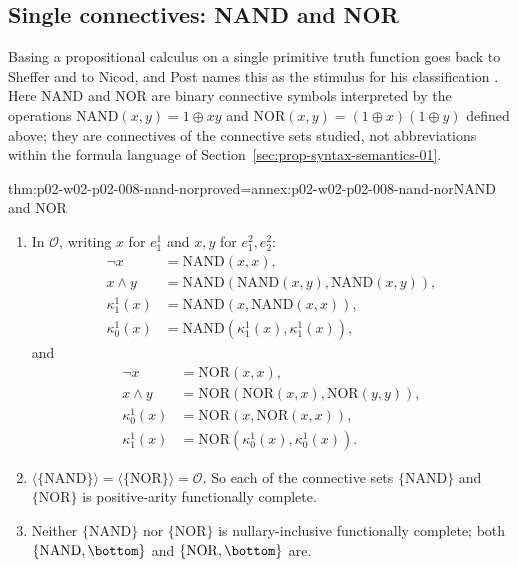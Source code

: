\subsection{Single connectives: NAND and NOR}
\label{sec:p02-w02-p02-008-sheffer}

Basing a propositional calculus on a single primitive truth function goes back
to Sheffer and to Nicod, and Post names this as the stimulus for his
classification \cite[Introduction, p.~2]{Post1941}.  Here \(\mathrm{NAND}\)
and \(\mathrm{NOR}\) are binary connective symbols interpreted by the
operations \(\mathrm{NAND}(x,y)=1\oplus xy\) and
\(\mathrm{NOR}(x,y)=(1\oplus x)(1\oplus y)\) defined above; they are
connectives of the connective sets studied, not abbreviations within the
formula language of Section~\ref{sec:prop-syntax-semantics-01}.

\begin{hbtheorem}{thm:p02-w02-p02-008-nand-nor}{proved=annex:p02-w02-p02-008-nand-nor}{NAND and NOR}
\begin{enumerate}
\item In \(\mathcal O\), writing \(x\) for \(e^1_1\) and \(x,y\) for
  \(e^2_1,e^2_2\):
  \[
  \begin{aligned}
   \neg x&=\mathrm{NAND}(x,x),\\
   x\land y&=\mathrm{NAND}(\mathrm{NAND}(x,y),\mathrm{NAND}(x,y)),\\
   \kappa^1_1(x)&=\mathrm{NAND}(x,\mathrm{NAND}(x,x)),\\
   \kappa^1_0(x)&=\mathrm{NAND}(\kappa^1_1(x),\kappa^1_1(x)),
  \end{aligned}
  \]
  and
  \[
  \begin{aligned}
   \neg x&=\mathrm{NOR}(x,x),\\
   x\land y&=\mathrm{NOR}(\mathrm{NOR}(x,x),\mathrm{NOR}(y,y)),\\
   \kappa^1_0(x)&=\mathrm{NOR}(x,\mathrm{NOR}(x,x)),\\
   \kappa^1_1(x)&=\mathrm{NOR}(\kappa^1_0(x),\kappa^1_0(x)).
  \end{aligned}
  \]
\item \(\langle\{\mathrm{NAND}\}\rangle=\langle\{\mathrm{NOR}\}\rangle
  =\mathcal O\).  So each of the connective sets \(\{\mathrm{NAND}\}\) and
  \(\{\mathrm{NOR}\}\) is positive-arity functionally complete.
\item Neither \(\{\mathrm{NAND}\}\) nor \(\{\mathrm{NOR}\}\) is
  nullary-inclusive functionally complete; both
  \(\{\mathrm{NAND},\bottom\}\) and \(\{\mathrm{NOR},\bottom\}\) are.
\end{enumerate}
\end{hbtheorem}

